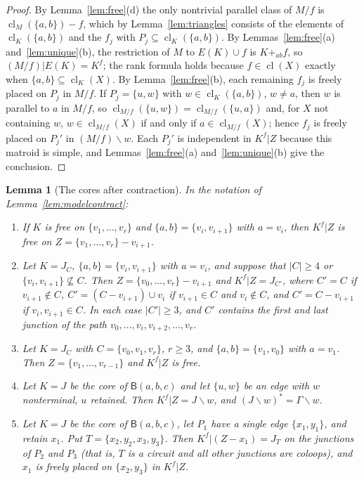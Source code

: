 \documentclass[11pt]{amsart}
\newtheorem{lemma}[theorem]{Lemma}
\theoremstyle{definition}
\theoremstyle{remark}
\numberwithin{equation}{section}
\newcommand{\cl}{\operatorname{cl}}
\newcommand{\FB}{\mathsf{B}}
\begin{document}
\begin{proof}
By Lemma~\ref{lem:free}(d) the only nontrivial parallel class of $M/f$ is $\cl_M(\{a,b\})-f$, which by Lemma~\ref{lem:triangles} consists of the elements of $\cl_K(\{a,b\})$ and the $f_j$ with $P_j\subseteq\cl_K(\{a,b\})$. By Lemmas~\ref{lem:free}(a) and~\ref{lem:unique}(b), the restriction of $M$ to $E(K)\cup f$ is $K+_{ab}f$, so $(M/f)|E(K)=K^f$; the rank formula holds because $f\in\cl(X)$ exactly when $\{a,b\}\subseteq\cl_K(X)$. By Lemma~\ref{lem:free}(b), each remaining $f_j$ is freely placed on $P_j$ in $M/f$. If $P_j=\{u,w\}$ with $w\in\cl_K(\{a,b\})$, $w\ne a$, then $w$ is parallel to $a$ in $M/f$, so $\cl_{M/f}(\{u,w\})=\cl_{M/f}(\{u,a\})$ and, for $X$ not containing $w$, $w\in\cl_{M/f}(X)$ if and only if $a\in\cl_{M/f}(X)$; hence $f_j$ is freely placed on $P_j'$ in $(M/f)\backslash w$. Each $P_j'$ is independent in $K^f|Z$ because this matroid is simple, and Lemmas~\ref{lem:free}(a) and~\ref{lem:unique}(b) give the conclusion.
\end{proof}

\begin{lemma}[The cores after contraction]\label{lem:cores}
In the notation of Lemma~\ref{lem:modelcontract}:
\begin{enumerate}[label=\textup{(\alph*)}]
\item If $K$ is free on $\{v_1,\dots,v_r\}$ and $\{a,b\}=\{v_i,v_{i+1}\}$ with $a=v_i$, then $K^f|Z$ is free on $Z=\{v_1,\dots,v_r\}-v_{i+1}$.
\item Let $K=J_C$, $\{a,b\}=\{v_i,v_{i+1}\}$ with $a=v_i$, and suppose that $|C|\ge4$ or $\{v_i,v_{i+1}\}\not\subseteq C$. Then $Z=\{v_0,\dots,v_r\}-v_{i+1}$ and $K^f|Z=J_{C'}$, where $C'=C$ if $v_{i+1}\notin C$, $C'=(C-v_{i+1})\cup v_i$ if $v_{i+1}\in C$ and $v_i\notin C$, and $C'=C-v_{i+1}$ if $v_i,v_{i+1}\in C$. In each case $|C'|\ge3$, and $C'$ contains the first and last junction of the path $v_0,\dots,v_i,v_{i+2},\dots,v_r$.
\item Let $K=J_C$ with $C=\{v_0,v_1,v_r\}$, $r\ge3$, and $\{a,b\}=\{v_1,v_0\}$ with $a=v_1$. Then $Z=\{v_1,\dots,v_{r-1}\}$ and $K^f|Z$ is free.
\item Let $K=J$ be the core of $\FB(a,b,c)$ and let $\{u,w\}$ be an edge with $w$ nonterminal, $u$ retained. Then $K^f|Z=J\backslash w$, and $(J\backslash w)^*=\Gamma\backslash w$.
\item Let $K=J$ be the core of $\FB(a,b,c)$, let $P_1$ have a single edge $\{x_1,y_1\}$, and retain $x_1$. Put $T=\{x_2,y_2,x_3,y_3\}$. Then $K^f|(Z-x_1)=J_{T}$ on the junctions of $P_2$ and $P_3$ \textup{(}that is, $T$ is a circuit and all other junctions are coloops\textup{)}, and $x_1$ is freely placed on $\{x_2,y_3\}$ in $K^f|Z$.
\end{enumerate}
\end{lemma}
\end{document}
